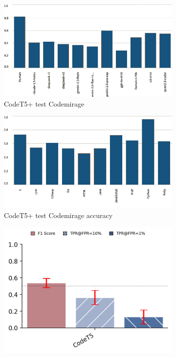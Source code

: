 \begin{figure}[H]
    \centering
    \begin{subfigure}[t]{0.35\textwidth}
        \centering
        \includegraphics[width=\linewidth]{img/TEST/CodeT5/visualization(37).png}
        \caption{CodeT5+ test Codemirage}
        \label{fig:2}
    \end{subfigure}
    \hfill
    \begin{subfigure}[t]{0.35\textwidth}
        \centering
        \includegraphics[width=\linewidth]{img/TEST/CodeT5/visualization(38).png}
        \caption{CodeT5+ test Codemirage accuracy}
        \label{fig:ab2}
    \end{subfigure}
    \hfill
    \begin{subfigure}[t]{0.5\textwidth}
        \centering
        \includegraphics[width=\linewidth]{img/TEST/CodeT5/oioi.png}

\end{subfigure}
\end{figure}
